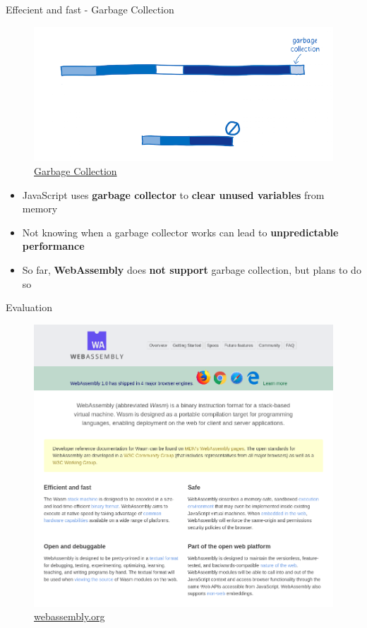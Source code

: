 \documentclass{beamer}
\begin{document}
\begin{frame}{Effecient and fast - Garbage Collection}
    \begin{figure}
        \includegraphics[scale=0.2]{./images/garbage.png}
        \caption{\href{https://www.smashingmagazine.com/2017/05/abridged-cartoon-introduction-webassembly/}{Garbage Collection}}
    \end{figure}
    \begin{itemize}
        \item JavaScript uses \textbf{garbage collector} to \textbf{clear unused variables} from memory
        \item Not knowing when a garbage collector works can lead to \textbf{unpredictable performance}
        \item So far, \textbf{WebAssembly} does \textbf{not support} garbage collection, but plans to do so
    \end{itemize}
\end{frame}

\begin{frame}{Evaluation}
    \begin{figure}
        \includegraphics[scale=0.2]{./images/webassembly_org.png}
        \caption{\href{https://webassembly.org/}{webassembly.org}}
    \end{figure}
\end{frame}
\end{document}

